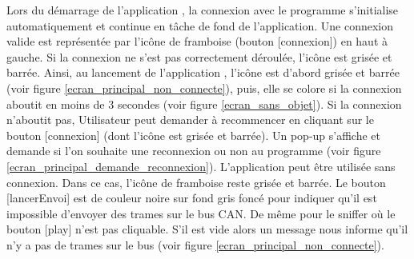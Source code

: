 Lors du démarrage de l'application {\nomApplication}, la connexion avec le programme {\nomLogiciel} s'initialise automatiquement et continue en tâche de fond de l'application. Une connexion valide est représentée par l'icône de framboise (bouton [connexion]) en haut à gauche. Si la connexion ne s'est pas correctement déroulée, l'icône est grisée et barrée. Ainsi, au lancement de l'application {\nomApplication}, l'icône est d'abord grisée et barrée (voir figure \ref{ecran_principal_non_connecte}), puis, elle se colore si la connexion aboutit en moins de 3 secondes (voir figure \ref{ecran_sans_objet}). Si la connexion n'aboutit pas, Utilisateur peut demander à recommencer en cliquant sur le bouton [connexion] (dont l'icône est grisée et barrée). Un pop-up s'affiche et demande si l'on souhaite une reconnexion ou non au programme {\nomLogiciel} (voir figure \ref{ecran_principal_demande_reconnexion}). L'application {\nomApplication} peut être utilisée sans connexion. Dans ce cas, l'icône de framboise reste grisée et barrée. Le bouton [lancerEnvoi] est de couleur noire sur fond gris foncé pour indiquer qu'il est impossible d'envoyer des trames sur le bus CAN. De même pour le sniffer où le bouton [play] n'est pas cliquable. S'il est vide alors un message nous informe qu'il n'y a pas de trames sur le bus (voir figure \ref{ecran_principal_non_connecte}). 

